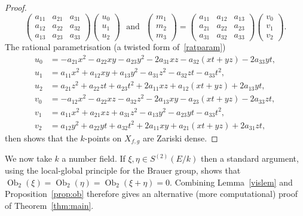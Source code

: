 \documentclass[12pt]{amsart}
\newcommand{\Ob}{\operatorname{Ob}}
\theoremstyle{definition}
\begin{document}
\begin{proof}
\[\begin{pmatrix}
a_{11} & a_{21} & a_{31} \\
a_{12} & a_{22} & a_{32} \\
a_{13} & a_{23} & a_{33} 
\end{pmatrix} \begin{pmatrix} u_0 \\ u_1 \\ u_2 \end{pmatrix}
\,\, \text{ and } \,\,
\begin{pmatrix} m_1 \\ m_2 \\ m_3 \end{pmatrix}
= \begin{pmatrix} 
a_{11} & a_{12} & a_{13} \\
a_{21} & a_{22} & a_{23} \\
a_{31} & a_{32} & a_{33} 
\end{pmatrix} \begin{pmatrix} v_0 \\ v_1 \\ v_2 \end{pmatrix}.
\]
The rational parametrisation (a twisted form of~\eqref{ratparam})
\begin{align*}
  u_0 &= -a_{21} x^2 - a_{22} x y - a_{23} y^2 - 2 a_{31} x z - a_{32} (x t + y z) - 2 a_{33} y t, \\
  u_1 &= a_{11} x^2 + a_{12} x y + a_{13} y^2 - a_{31} z^2 - a_{32} z t - a_{33} t^2, \\
  u_2 &= a_{21} z^2 + a_{22} z t + a_{23} t^2 + 2 a_{11} x z + a_{12} (x t + y z) + 2 a_{13} y t, \\
  v_0 &= -a_{12} x^2 - a_{22} x z - a_{32} z^2 - 2 a_{13} x y - a_{23} (x t + y z) - 2 a_{33} z t, \\
  v_1 &= a_{11} x^2 + a_{21} x z + a_{31} z^2 - a_{13} y^2 - a_{23} y t - a_{33} t^2, \\
  v_2 &= a_{12} y^2 + a_{22} y t + a_{32} t^2 + 2 a_{11} x y + a_{21} (x t + y z) + 2 a_{31} z t,
\end{align*}
then shows that the $k$-points on $X_{f,g}$ are Zariski dense.
\end{proof}  

We now take $k$ a number field. If $\xi,\eta \in S^{(2)}(E/k)$ then a
standard argument, using the local-global principle for the Brauer
group, shows that $\Ob_2(\xi) = \Ob_2(\eta) = \Ob_2(\xi + \eta) =
0$. Combining Lemma~\ref{vislem} and Proposition~\ref{prop:ob}
therefore gives an alternative (more computational) proof of
Theorem~\ref{thm:main}.
\end{document}
